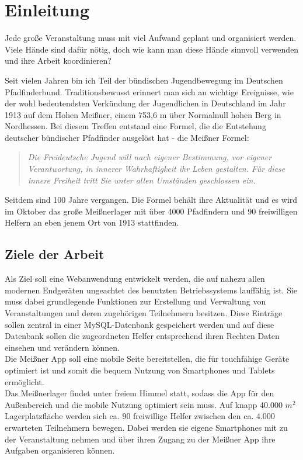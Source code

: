 \chapter{Einleitung}
Jede große Veranstaltung muss mit viel Aufwand geplant und organisiert werden. Viele Hände sind dafür nötig, doch wie kann man diese Hände sinnvoll verwenden und ihre Arbeit koordinieren?\par

Seit vielen Jahren bin ich Teil der bündischen Jugendbewegung im Deutschen Pfadfinderbund. Traditionsbewusst erinnert man sich an wichtige Ereignisse, wie der wohl bedeutendsten Verkündung der Jugendlichen in Deutschland im Jahr 1913 auf dem Hohen Meißner, einem 753,6 m über Normalnull hohen Berg in Nordhessen. Bei diesem Treffen entstand eine Formel, die die Entstehung deutscher bündischer Pfadfinder ausgelöst hat - die Meißner Formel:
\begin{quote}
	\textit{\glqq Die Freideutsche Jugend will nach eigener Bestimmung, vor eigener Verantwortung, in innerer Wahrhaftigkeit ihr Leben gestalten. Für diese innere Freiheit tritt Sie unter allen Umständen geschlossen ein.\grqq{}}\cite[S. 109]{meissnerformel}
\end{quote}
Seitdem sind 100 Jahre vergangen. Die Formel behält ihre Aktualität und es wird im Oktober das große Meißnerlager mit über 4000 Pfadfindern und 90 freiwilligen Helfern an eben jenem Ort von 1913 stattfinden.

\section{Ziele der Arbeit}
Als Ziel soll eine Webanwendung entwickelt werden, die auf nahezu allen modernen Endgeräten ungeachtet des benutzten Betriebssystems lauffähig ist. Sie muss dabei grundlegende Funktionen zur Erstellung und Verwaltung von Veranstaltungen und deren zugehörigen Teilnehmern besitzen. Diese Einträge sollen zentral in einer MySQL-Datenbank gespeichert werden und auf diese Datenbank sollen die zugeordneten Helfer entsprechend ihren Rechten Daten einsehen und verändern können.\\
Die Meißner App soll eine mobile Seite bereitstellen, die für touchfähige Geräte optimiert ist und somit die bequem Nutzung von Smartphones und Tablets ermöglicht.\\
Das Meißnerlager findet unter freiem Himmel statt, sodass die App für den Außenbereich und die mobile Nutzung optimiert sein muss. Auf knapp 40.000 $m^2$ Lagerplatzfläche werden sich ca. 90 freiwillige Helfer zwischen den ca. 4.000 erwarteten Teilnehmern bewegen. Dabei werden sie eigene Smartphones mit zu der Veranstaltung nehmen und über ihren Zugang zu der Meißner App ihre Aufgaben organisieren können.\par

